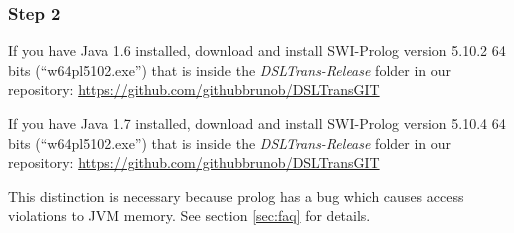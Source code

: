 \subsubsection{Step 2}

If you have Java 1.6 installed, download and install SWI-Prolog version 5.10.2 64 bits (``w64pl5102.exe'') that is inside the \emph{DSLTrans-Release} folder in our repository:
\url{https://github.com/githubbrunob/DSLTransGIT}

If you have Java 1.7 installed, download and install SWI-Prolog version 5.10.4 64 bits (``w64pl5102.exe'') that is inside the \emph{DSLTrans-Release} folder in our repository:
\url{https://github.com/githubbrunob/DSLTransGIT}

This distinction is necessary because prolog has a bug which causes access violations to JVM memory.
See section \ref{sec:faq} for details.



\clearpage

